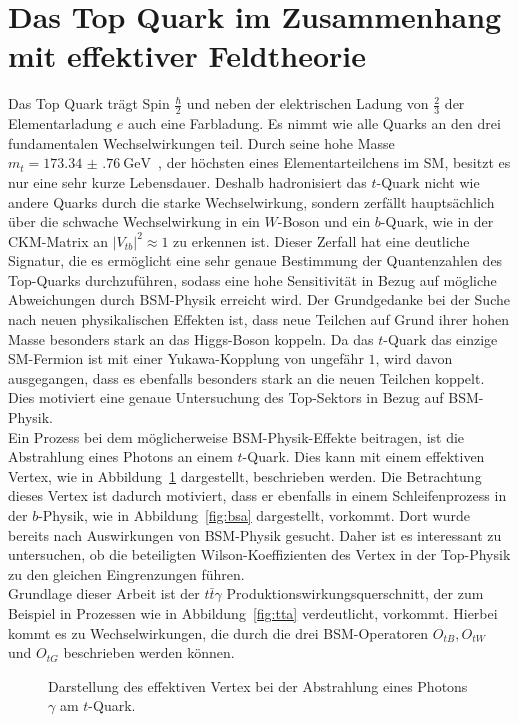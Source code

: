 \section{Das Top Quark im Zusammenhang mit effektiver Feldtheorie}
\label{top}
Das Top Quark trägt Spin $\frac{\hbar}{2}$ und neben der elektrischen Ladung von $\frac{2}{3}$ der
Elementarladung $e$ auch eine Farbladung. Es nimmt wie alle Quarks an den drei fundamentalen Wechselwirkungen
teil. Durch seine hohe Masse $m_t = \SI{173.34(76)}{\giga\electronvolt}$~\cite{ATLAS:2014wva}, der höchsten eines
Elementarteilchens im SM, besitzt es nur eine sehr kurze Lebensdauer. Deshalb hadronisiert das
$t$-Quark nicht wie andere Quarks durch die starke Wechselwirkung, sondern zerfällt hauptsächlich über die schwache Wechselwirkung in ein $W$-Boson und ein $b$-Quark, wie in der CKM-Matrix an $|V_{tb}|^2 \approx 1$ zu erkennen ist.
Dieser Zerfall hat eine deutliche Signatur, die es ermöglicht eine sehr genaue Bestimmung der Quantenzahlen des Top-Quarks durchzuführen, sodass eine hohe Sensitivität in Bezug auf mögliche Abweichungen durch BSM-Physik erreicht wird.
Der Grundgedanke bei der Suche nach neuen physikalischen Effekten ist, dass neue Teilchen auf Grund ihrer hohen Masse besonders stark an das Higgs-Boson koppeln. Da das $t$-Quark das einzige SM-Fermion ist mit einer Yukawa-Kopplung von ungefähr $1$, wird davon ausgegangen, dass es ebenfalls besonders stark an die neuen Teilchen koppelt. Dies motiviert eine genaue Untersuchung des Top-Sektors in Bezug auf BSM-Physik.\\
Ein Prozess bei dem möglicherweise BSM-Physik-Effekte beitragen, ist die Abstrahlung eines Photons an einem $t$-Quark. Dies kann mit einem effektiven Vertex, wie in Abbildung~\ref{fig:eftVertex} dargestellt, beschrieben werden. Die Betrachtung dieses Vertex ist dadurch motiviert, dass er ebenfalls in einem Schleifenprozess in der $b$-Physik, wie in Abbildung~\ref{fig:bsa} dargestellt, vorkommt. Dort wurde bereits nach Auswirkungen von BSM-Physik gesucht. Daher ist es interessant zu untersuchen, ob die beteiligten Wilson-Koeffizienten des Vertex in der Top-Physik zu den gleichen Eingrenzungen führen.\\
Grundlage dieser Arbeit ist der $t\bar{t}\gamma$ Produktionswirkungsquerschnitt, der zum Beispiel in Prozessen wie in Abbildung~\ref{fig:tta} verdeutlicht, vorkommt. Hierbei kommt es zu Wechselwirkungen, die durch die drei BSM-Operatoren $O_{tB}, O_{tW}$ und $O_{tG}$ beschrieben werden können\cite{Bylund:2016phk}.
\begin{figure}
  \centering
  \caption{Darstellung des effektiven Vertex bei der Abstrahlung eines Photons $\gamma$ am $t$-Quark.}
  \label{fig:eftVertex}
\end{figure}
